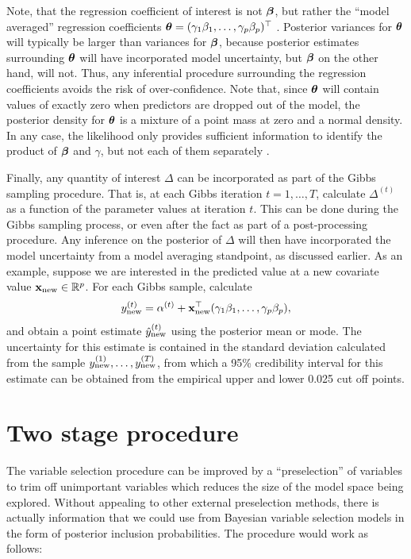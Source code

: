 \documentclass[showframe,11pt,twoside,openright]{report}
\begin{document}
Note, that the regression coefficient of interest is not ${\bm\beta}$, but rather the ``model averaged'' regression coefficients ${\bm\theta} = (\gamma_1\beta_1,\dots,\gamma_p\beta_p)^\top$ \citep{madigan1994model}.
Posterior variances for ${\bm\theta}$ will typically be larger than variances for ${\bm\beta}$, because posterior estimates surrounding ${\bm\theta}$ will have incorporated model uncertainty, but ${\bm\beta}$ on the other hand, will not.
Thus, any inferential procedure surrounding the regression coefficients avoids the risk of over-confidence.
Note that, since ${\bm\theta}$ will contain values of exactly zero when predictors are dropped out of the model, the posterior density for ${\bm\theta}$ is a mixture of a point mass at zero and a normal density.
In any case, the likelihood only provides sufficient information to identify the product of ${\bm\beta}$ and $\gamma$, but not each of them separately \citep{Kuo1998}.

Finally, any quantity of interest $\Delta$ can be incorporated as part of the Gibbs sampling procedure.
That is, at each Gibbs iteration $t=1,\dots,T$, calculate $\Delta^{(t)}$ as a function of the parameter values at iteration $t$.
This can be done during the Gibbs sampling process, or even after the fact as part of a post-processing procedure.
Any inference on the posterior of $\Delta$ will then have incorporated the model uncertainty from a model averaging standpoint, as discussed earlier.
As an example, suppose we are interested in the predicted value at a new covariate value ${\mathbf x}_\text{new} \in \mathbb{R}^p$.
For each Gibbs sample, calculate
\[
  y_{\text{new}}^{(t)} = \alpha^{(t)} + {\mathbf x}_\text{new}^\top (\gamma_1\beta_1,\dots,\gamma_p\beta_p),
\]
and obtain a point estimate $\hat y_{\text{new}}^{(t)}$ using the posterior mean or mode.
The uncertainty for this estimate is contained in the standard deviation calculated from the sample $y_{\text{new}}^{(1)},\dots,y_{\text{new}}^{(T)}$, from which a 95\% credibility interval for this estimate can be obtained from the empirical upper and lower 0.025 cut off points.

\section{Two stage procedure}

The variable selection procedure can be improved by a ``preselection'' of variables to trim off unimportant variables which reduces the size of the model space being explored.
Without appealing to other external preselection methods, there is actually information that we could use from Bayesian variable selection models in the form of posterior inclusion probabilities.
The procedure would work as follows:
\end{document}
